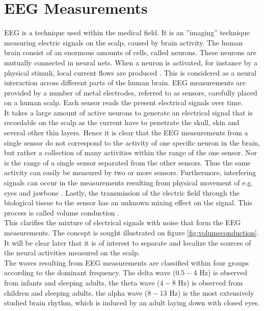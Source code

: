 \section{EEG Measurements}\label{sec:EEG}
EEG is a technique used within the medical field. 
It is an ''imaging'' technique measuring electric signals on the scalp, caused by brain activity. 
The human brain consist of an enormous amounts of cells, called neurons. 
These neurons are mutually connected in neural nets. When a neuron is activated, for instance by a physical stimuli, local current flows are produced \cite{fundamentalEEG}. This is considered as a neural interaction across different parts of the human brain.   
EEG measurements are provided by a number of metal electrodes, referred to as sensors, carefully placed on a human scalp. 
Each sensor reads the present electrical signals over time.
\\
It takes a large amount of active neurons to generate an electrical signal that is recordable on the scalp as the current have to penetrate the skull, skin and several other thin layers.
Hence it is clear that the EEG measurements from a single sensor do not correspond to the activity of one specific neuron in the brain, but rather a collection of many activities within the range of the one sensor.
Nor is the range of a single sensor separated from the other sensors. Thus the same activity can easily be measured by two or more sensors.
Furthermore, interfering signals can occur in the measurements resulting from physical movement of e.g. eyes and jawbone \cite{fundamentalEEG}. 
Lastly, the transmission of the electric field through the biological tissue to the sensor has an unknown mixing effect on the signal. This process is called volume conduction \cite[p. 68]{EEGsignalprocessing} \cite{Van2019}.
\\
This clarifies the mixture of electrical signals with noise that form the EEG measurements. 
The concept is sought illustrated on figure \ref{fig:volumeconduction}. 
\\
It will be clear later that it is of interest to separate and localize the sources of the neural activities measured on the scalp.  
\\ 
The waves resulting from EEG measurements are classified within four groups according to the dominant frequency. 
The delta wave ($0.5-4$ Hz) is observed from infants and sleeping adults, the theta wave ($4-8$ Hz) is observed from children and sleeping adults, the alpha wave ($8-13$ Hz) is the most extensively studied brain rhythm, which is induced by an adult laying down with closed eyes. 
